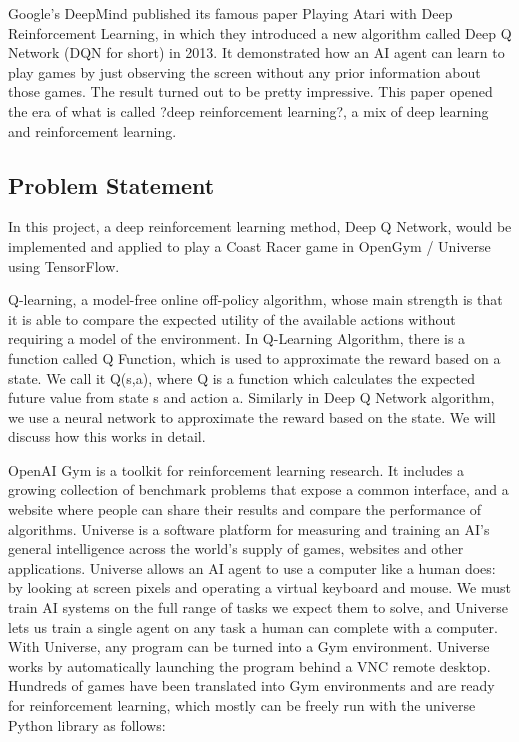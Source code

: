 \documentclass[a4paper]{article}
\begin{document}
Google's DeepMind published its famous paper Playing Atari with Deep Reinforcement Learning, in which they introduced a new algorithm called Deep Q Network (DQN for short) in 2013. It demonstrated how an AI agent can learn to play games by just observing the screen without any prior information about those games. The result turned out to be pretty impressive. This paper opened the era of what is called ?deep reinforcement learning?, a mix of deep learning and reinforcement learning.

\subsection{Problem Statement}
\label{subsec:problem-statement}

In this project, a deep reinforcement learning method, Deep Q Network, would be implemented and applied to play a Coast Racer game in OpenGym / Universe using TensorFlow.

Q-learning, a model-free online off-policy algorithm, whose main strength is that it is able to compare the expected utility of the available actions without requiring a model of the environment. In Q-Learning Algorithm, there is a function called Q Function, which is used to approximate the reward based on a state. We call it Q(s,a), where Q is a function which calculates the expected future value from state s and action a. Similarly in Deep Q Network algorithm, we use a neural network to approximate the reward based on the state. We will discuss how this works in detail.

OpenAI Gym is a toolkit for reinforcement learning research. It includes a growing collection of benchmark problems that expose a common interface, and a website where people can share their results and compare the performance of algorithms. Universe is a software platform for measuring and training an AI's general intelligence across the world's supply of games, websites and other applications. Universe allows an AI agent to use a computer like a human does: by looking at screen pixels and operating a virtual keyboard and mouse. We must train AI systems on the full range of tasks we expect them to solve, and Universe lets us train a single agent on any task a human can complete with a computer. With Universe, any program can be turned into a Gym environment. Universe works by automatically launching the program behind a VNC remote desktop. Hundreds of games have been translated into Gym environments and are ready for reinforcement learning, which mostly can be freely run with the universe Python library as follows:
\end{document}
